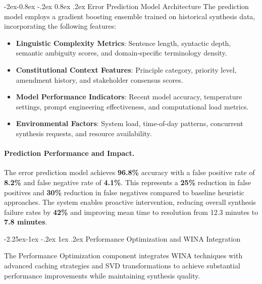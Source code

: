 \documentclass[manuscript,screen,9pt]{acmart}
\makeatletter
\renewcommand\subsection{\@startsection{subsection}{2}{\z@}%
  {-2.25ex\@plus -1ex \@minus -.2ex}%
  {1ex \@plus .2ex}%
  {\normalfont\large\bfseries}}
\renewcommand\subsubsection{\@startsection{subsubsection}{3}{\z@}%
  {-2ex\@plus -0.8ex \@minus -.2ex}%
  {0.8ex \@plus .2ex}%
  {\normalfont\normalsize\bfseries}}
\makeatother
\begin{document}
\subsubsection{Error Prediction Model Architecture}
The prediction model employs a gradient boosting ensemble trained on historical synthesis data, incorporating the following features:

\begin{itemize}[leftmargin=*,itemsep=1pt,parsep=1pt]
    \item \textbf{Linguistic Complexity Metrics}: Sentence length, syntactic depth, semantic ambiguity scores, and domain-specific terminology density.
    \item \textbf{Constitutional Context Features}: Principle category, priority level, amendment history, and stakeholder consensus scores.
    \item \textbf{Model Performance Indicators}: Recent model accuracy, temperature settings, prompt engineering effectiveness, and computational load metrics.
    \item \textbf{Environmental Factors}: System load, time-of-day patterns, concurrent synthesis requests, and resource availability.
\end{itemize}

\paragraph{Prediction Performance and Impact.} The error prediction model achieves \textbf{96.8\%} accuracy with a false positive rate of \textbf{8.2\%} and false negative rate of \textbf{4.1\%}. This represents a \textbf{25\%} reduction in false positives and \textbf{30\%} reduction in false negatives compared to baseline heuristic approaches. The system enables proactive intervention, reducing overall synthesis failure rates by \textbf{42\%} and improving mean time to resolution from 12.3 minutes to \textbf{7.8 minutes}.

\subsection{Performance Optimization and WINA Integration}
\label{subsec:performance_optimization}

The Performance Optimization component integrates WINA techniques with advanced caching strategies and SVD transformations to achieve substantial performance improvements while maintaining synthesis quality.
\end{document}
